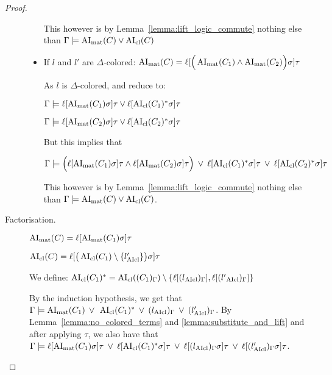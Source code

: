 \documentclass[,%
	paper=a4,%
	DIV12, %
	twoside=false,%
	liststotoc,
	bibtotoc,
	draft=false,%
	numbers=noendperiod
]{scrartcl}
\begin{document}
\begin{proof}
\begin{description}
\begin{itemize}
					This however is by Lemma~\ref{lemma:lift_logic_commute} nothing else than
					$\Gamma \models \operatorname{AI}_\mathrm{mat}(C) \lor \operatorname{AI}_\mathrm{cl}(C)$

				\item If $l$ and $l'$ are $\Delta$-colored:
					$\operatorname{AI}_\mathrm{mat}(C) = \ell[\Big(\operatorname{AI}_\mathrm{mat}(C_1) \land \operatorname{AI}_\mathrm{mat}(C_2)\Big)\sigma] \tau$

					As $l$ is $\Delta$-colored, \markA{} and \markB{} reduce to:

					$\Gamma \models \ell[\operatorname{AI}_\mathrm{mat}(C_1)\sigma]\tau \lor \ell[\operatorname{AI}_\mathrm{cl}(C_1)^*\sigma]\tau$

					$\Gamma \models \ell[\operatorname{AI}_\mathrm{mat}(C_2)\sigma]\tau \lor \ell[\operatorname{AI}_\mathrm{cl}(C_2)^*\sigma]\tau$

					But this implies that 

					$\Gamma \models \Big(\ell[\operatorname{AI}_\mathrm{mat}(C_1)\sigma]\tau \land \ell[\operatorname{AI}_\mathrm{mat}(C_2)\sigma]\tau\Big) 
					\;\,{\lor}\;\, \ell[\operatorname{AI}_\mathrm{cl}(C_1)^*\sigma]\tau
					\;\,{\lor}\;\, \ell[\operatorname{AI}_\mathrm{cl}(C_2)^*\sigma]\tau$

					This however is by Lemma~\ref{lemma:lift_logic_commute} nothing else than 
					$\Gamma \models \operatorname{AI}_\mathrm{mat}(C) \lor \operatorname{AI}_\mathrm{cl}(C)$.
			\end{itemize}


		\item[Factorisation.]\hfill
			\begin{prooftree} 
			\end{prooftree} 

			$\operatorname{AI}_\mathrm{mat}(C) = \ell[\operatorname{AI}_\mathrm{mat}(C_1)\sigma]\tau$

			$\operatorname{AI}_\mathrm{cl}(C) = \ell[ \big(\operatorname{AI}_\mathrm{cl}(C_1) \setminus \{l'_{\operatorname{AIcl}}\}\big)\sigma]\tau$

			We define:
			$ \operatorname{AI}_\mathrm{cl}(C_1)^* = \operatorname{AI}_\mathrm{cl}((C_1)_\Gamma) \setminus \{\ell[(l{_{\operatorname{AIcl}}})_\Gamma], \ell[(l'{_{\operatorname{AIcl}}})_\Gamma]\}$

			By the induction hypothesis, we get that 
			$\Gamma \models \operatorname{AI}_\mathrm{mat}(C_1) \;\,{\lor}\;\, \operatorname{AI}_\mathrm{cl}(C_1)^* \;\,{\lor}\;\, (l_{\operatorname{AIcl}})_\Gamma \;\,{\lor}\;\, (l'_{\operatorname{AIcl}})_\Gamma $.
			By Lemma~\ref{lemma:no_colored_terms} and \ref{lemma:substitute_and_lift} and after applying $\tau$, we also have that
			$\Gamma \models \ell[\operatorname{AI}_\mathrm{mat}(C_1)\sigma]\tau \;\,{\lor}\;\,\allowbreak \ell[\operatorname{AI}_\mathrm{cl}(C_1)^*\sigma]\tau \;\,{\lor}\;\,\allowbreak \ell[(l_{\operatorname{AIcl}})_\Gamma\sigma]\tau \;\,{\lor}\;\,\allowbreak \ell[(l'_{\operatorname{AIcl}})_\Gamma\sigma]\tau $.


\end{description}
\end{proof}
\end{document}
